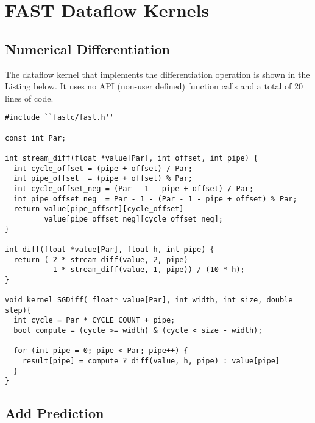 \chapter{FAST Dataflow Kernels}

\section{Numerical Differentiation}

\label{app:numdiff}

The \FAST{} dataflow kernel that implements the differentiation
operation is shown in the Listing below. It uses no API (non-user
defined) function calls and a total of 20 lines of code.

\begin{lstlisting}
#include ``fastc/fast.h''

const int Par;

int stream_diff(float *value[Par], int offset, int pipe) {
  int cycle_offset = (pipe + offset) / Par;
  int pipe_offset  = (pipe + offset) % Par;
  int cycle_offset_neg = (Par - 1 - pipe + offset) / Par;
  int pipe_offset_neg  = Par - 1 - (Par - 1 - pipe + offset) % Par;
  return value[pipe_offset][cycle_offset] -
         value[pipe_offset_neg][cycle_offset_neg];
}

int diff(float *value[Par], float h, int pipe) {
  return (-2 * stream_diff(value, 2, pipe)
          -1 * stream_diff(value, 1, pipe)) / (10 * h);
}

void kernel_SGDiff( float* value[Par], int width, int size, double step){
  int cycle = Par * CYCLE_COUNT + pipe;
  bool compute = (cycle >= width) & (cycle < size - width);

  for (int pipe = 0; pipe < Par; pipe++) {
    result[pipe] = compute ? diff(value, h, pipe) : value[pipe]
  }
}
\end{lstlisting}

\section{Add Prediction}

